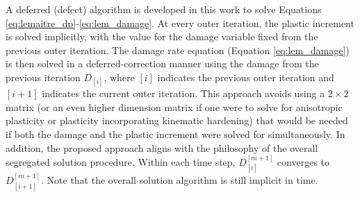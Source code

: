 \documentclass[sn-mathphys,Numbered]{sn-jnl}%
\begin{document}
A deferred (defect) algorithm is developed in this work to solve Equations \ref{eq:lemaitre_dp}-\ref{eq:lem_damage}.
At every outer iteration, the plastic increment is solved implicitly, with the value for the damage variable fixed from the previous outer iteration.
The damage rate equation (Equation \ref{eq:lem_damage}) is then solved in a deferred-correction manner using the damage from the previous iteration $D_{[i]}$, where $[i]$ indicates the previous outer iteration and $[i+1]$ indicates the current outer iteration.
This approach avoids using a $2 \times 2$ matrix (or an even higher dimension matrix if one were to solve for anisotropic plasticity or plasticity incorporating kinematic hardening) that would be needed if both the damage and the plastic increment were solved for simultaneously.
In addition, the proposed approach aligns with the philosophy of the overall segregated solution procedure.
Within each time step, $D^{[m+1]}_{[i]}$ converges to $D^{[m+1]}_{[i+1]}$.
Note that the overall solution algorithm is still implicit in time.

%


\end{document}
